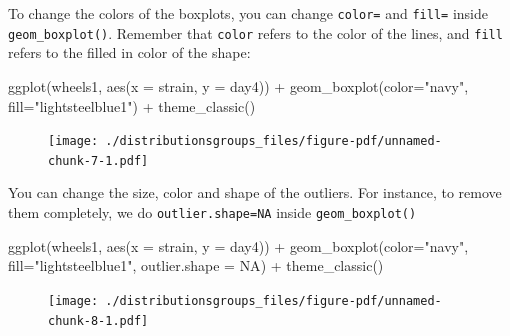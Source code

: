 \documentclass[
  letterpaper,
  DIV=11,
  numbers=noendperiod]{scrreprt}
\newenvironment{Shaded}{\begin{snugshade}}{\end{snugshade}}
\newcommand{\AttributeTok}[1]{\textcolor[rgb]{0.40,0.45,0.13}{#1}}
\newcommand{\ConstantTok}[1]{\textcolor[rgb]{0.56,0.35,0.01}{#1}}
\newcommand{\FunctionTok}[1]{\textcolor[rgb]{0.28,0.35,0.67}{#1}}
\newcommand{\NormalTok}[1]{\textcolor[rgb]{0.00,0.23,0.31}{#1}}
\newcommand{\SpecialCharTok}[1]{\textcolor[rgb]{0.37,0.37,0.37}{#1}}
\newcommand{\StringTok}[1]{\textcolor[rgb]{0.13,0.47,0.30}{#1}}
\begin{document}
To change the colors of the boxplots, you can change \texttt{color=} and
\texttt{fill=} inside \texttt{geom\_boxplot()}. Remember that
\texttt{color} refers to the color of the lines, and \texttt{fill}
refers to the filled in color of the shape:

\begin{Shaded}
\begin{Highlighting}[]
\FunctionTok{ggplot}\NormalTok{(wheels1, }\FunctionTok{aes}\NormalTok{(}\AttributeTok{x =}\NormalTok{ strain, }\AttributeTok{y =}\NormalTok{ day4)) }\SpecialCharTok{+} 
  \FunctionTok{geom\_boxplot}\NormalTok{(}\AttributeTok{color=}\StringTok{"navy"}\NormalTok{, }\AttributeTok{fill=}\StringTok{"lightsteelblue1"}\NormalTok{) }\SpecialCharTok{+}
  \FunctionTok{theme\_classic}\NormalTok{()}
\end{Highlighting}
\end{Shaded}

\begin{figure}[H]

{\centering \texttt{[image: ./distributionsgroups\_files/figure-pdf/unnamed-chunk-7-1.pdf]}

}

\end{figure}

You can change the size, color and shape of the outliers. For instance,
to remove them completely, we do \texttt{outlier.shape=NA} inside
\texttt{geom\_boxplot()}

\begin{Shaded}
\begin{Highlighting}[]
\FunctionTok{ggplot}\NormalTok{(wheels1, }\FunctionTok{aes}\NormalTok{(}\AttributeTok{x =}\NormalTok{ strain, }\AttributeTok{y =}\NormalTok{ day4)) }\SpecialCharTok{+} 
  \FunctionTok{geom\_boxplot}\NormalTok{(}\AttributeTok{color=}\StringTok{"navy"}\NormalTok{, }\AttributeTok{fill=}\StringTok{"lightsteelblue1"}\NormalTok{, }\AttributeTok{outlier.shape =} \ConstantTok{NA}\NormalTok{) }\SpecialCharTok{+}
  \FunctionTok{theme\_classic}\NormalTok{()}
\end{Highlighting}
\end{Shaded}

\begin{figure}[H]

{\centering \texttt{[image: ./distributionsgroups\_files/figure-pdf/unnamed-chunk-8-1.pdf]}

}

\end{figure}
\end{document}
